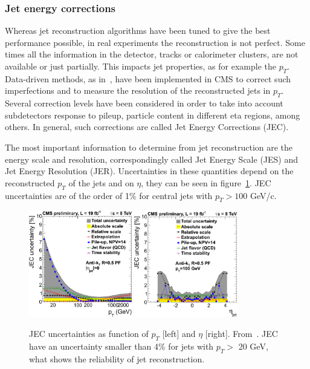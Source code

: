 \subsubsection{Jet energy corrections}

Whereas jet reconstruction algorithms have been tuned to give the best performance possible, in real experiments the reconstruction is not perfect. Some times all the information in the detector, tracks or calorimeter clusters, are not available or just partially. This impacts jet properties, as for example the $p_{T}$. Data-driven methods, as in~\cite{2011JInst...611002C}, have been implemented in CMS to correct such imperfections and to measure the resolution of the reconstructed jets in $p_{T}$. Several correction levels have been considered in order to take into account subdetectors response to pileup, particle content in different eta regions, among others. In general, such corrections are called Jet Energy Corrections (JEC). 

The most important information to determine from jet reconstruction are the energy scale and resolution, correspondingly called Jet Energy Scale (JES) and Jet Energy Resolution (JER). Uncertainties in these quantities depend on the reconstructed $p_{T}$ of the jets and on $\eta$, they can be seen in figure~\ref{fig:JEC}. JEC uncertainties are of the order of 1\% for central jets with $p_{T}>100$ GeV/c.

\begin{figure}[!Hhtbp]
  \begin{center}
    \includegraphics[width=0.4\textwidth]{figs/JEC_pt.png}
    \includegraphics[width=0.4\textwidth]{figs/JEC_eta.png}
    \caption{JEC uncertainties as function of $p_{T}$ [left] and $\eta$ [right]. From~\cite{Brochet:1956723}. JEC have an uncertainty smaller than 4\% for jets with $p_{T}>$ 20 GeV, what shows the reliability of jet reconstruction.}
    \label{fig:JEC}
  \end{center}
\end{figure}

